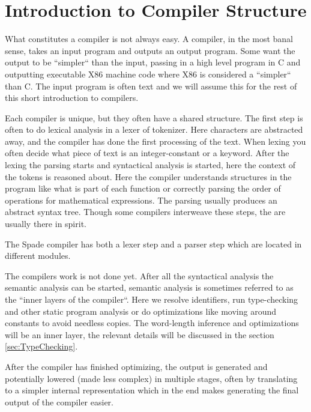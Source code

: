 \documentclass[msc,lith,english]{liuthesis}
\begin{document}
\section{Introduction to Compiler Structure}
What constitutes a compiler is not always easy. A compiler, in the most banal sense, takes an input program and outputs an output program. Some want the output to be ``simpler`` than the input, passing in a high level program in C and outputting executable X86 machine code where X86 is considered a ``simpler`` than C. The input program is often text and we will assume this for the rest of this short introduction to compilers.

Each compiler is unique, but they often have a shared structure. The first step is often to do lexical analysis in a lexer of tokenizer. Here characters are abstracted away, and the compiler has done the first processing of the text. When lexing you often decide what piece of text is an integer-constant or a keyword. After the lexing the parsing starts and syntactical analysis is started, here the context of the tokens is reasoned about. Here the compiler understands structures in the program like what is part of each function or correctly parsing the order of operations for mathematical expressions. The parsing usually produces an abstract syntax tree. Though some compilers interweave these steps, the are usually there in spirit.

The Spade compiler has both a lexer step and a parser step which are located in different modules.

The compilers work is not done yet. After all the syntactical analysis the semantic analysis can be started, semantic analysis is sometimes referred to as the ``inner layers of the compiler``. Here we resolve identifiers, run type-checking and other static program analysis or do optimizations like moving around constants to avoid needless copies. The word-length inference and optimizations will be an inner layer, the relevant details will be discussed in the section \ref{sec:TypeChecking}. 


After the compiler has finished optimizing, the output is generated and potentially lowered (made less complex) in multiple stages, often by translating to a simpler internal representation which in the end makes generating the final output of the compiler easier.
\end{document}
